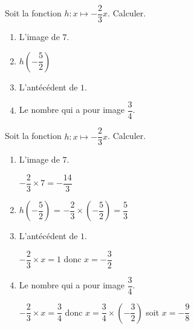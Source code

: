 \begin{exercice}
    Soit la fonction $h:x\longmapsto -\dfrac{2}{3}x$. Calculer.
    \begin{enumerate}        
        \item L'image de $7$.\smallskip
        \item $h\left(-\dfrac{5}{2}\right)$\smallskip
        \item L'antécédent de $1$.
        \item Le nombre qui a pour image $\dfrac{3}{4}$.
    \end{enumerate}
\end{exercice}
\begin{corrige}
    Soit la fonction $h:x\longmapsto -\dfrac{2}{3}x$. Calculer.

    \begin{enumerate}        
        \item L'image de $7$.
        
        {\red $-\dfrac{2}{3}\times 7 = -\dfrac{14}{3}$}
        \item $h\left(-\dfrac{5}{2}\right)$ {\red = $-\dfrac{2}{3}\times \left(-\dfrac{5}{2}\right) = \dfrac{5}{3}$}        
        \item L'antécédent de $1$.
        
        {\red $-\dfrac{2}{3}\times x=1$ donc $x=-\dfrac{3}{2}$}
        \item Le nombre qui a pour image $\dfrac{3}{4}$.
        
        {\red $-\dfrac{2}{3}\times x = \dfrac{3}{4}$ donc $x=\dfrac{3}{4}\times \left(-\dfrac{3}{2}\right)$ soit $x=-\dfrac{9}{8}$}
    \end{enumerate}
\end{corrige}
